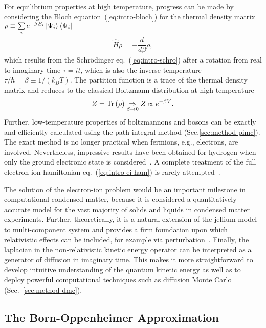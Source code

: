 For equilibrium properties at high temperature, progress can be made by considering the Bloch equation~(\ref{eq:intro-bloch}) for the thermal density matrix $\rho\equiv\sum\limits_i e^{-\beta E_i} \ket{\Psi_i}\bra{\Psi_i}$
\begin{align} \label{eq:intro-bloch}
\hat{H} \rho = -\dfrac{d}{d\beta}\rho,
\end{align}
which results from the Schr\"odinger eq.~(\ref{eq:intro-schro}) after a rotation from real to imaginary time $\tau = it$, which is also the inverse temperature $\tau/\hbar=\beta\equiv1/(k_BT)$.
The partition function is a trace of the thermal density matrix and reduces to the classical Boltzmann distribution at high temperature
\begin{align}
Z=\text{Tr}\left(\rho\right) \underset{\beta\rightarrow 0}{\Rightarrow} Z \propto e^{-\beta V}.
\end{align}
Further, low-temperature properties of boltzmannons and bosons can be exactly and efficiently calculated using the path integral method (Sec.\ref{sec:method-pimc}). The exact method is no longer practical when fermions, e.g., electrons, are involved. Nevertheless, impressive results have been obtained for hydrogen when only the ground electronic state is considered~\cite{Pierleoni2016b,Celliers2018}.
A complete treatment of the full electron-ion hamiltonian eq.~(\ref{eq:intro-ei-ham}) is rarely attempted~\cite{Ceperley1981,Natoli1995}.

The solution of the electron-ion problem would be an important milestone in computational condensed matter, because it is considered a quantitatively accurate model for the vast majority of solids and liquids in condensed matter experiments. Further, theoretically, it is a natural extension of the jellium model to multi-component system and provides a firm foundation upon which relativistic effects can be included, for example via perturbation~\cite{Chang2020}. Finally, the laplacian in the non-relativistic kinetic energy operator can be interpreted as a generator of diffusion in imaginary time. This makes it more straightforward to develop intuitive understanding of the quantum kinetic energy as well as to deploy powerful computational techniques such as diffusion Monte Carlo (Sec.~\ref{sec:method-dmc}).

\subsection{The Born-Oppenheimer Approximation}

